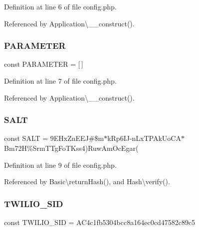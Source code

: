 Definition at line 6 of file config.\+php.



Referenced by Application\textbackslash{}\+\_\+\+\_\+construct().

\hypertarget{config_8php_a75466fbd8ac40be3d3c185c9974118e7}{}\label{config_8php_a75466fbd8ac40be3d3c185c9974118e7} 
\subsubsection{\texorpdfstring{P\+A\+R\+A\+M\+E\+T\+ER}{PARAMETER}}
{\footnotesize\ttfamily const P\+A\+R\+A\+M\+E\+T\+ER = \mbox{[}$\,$\mbox{]}}



Definition at line 7 of file config.\+php.



Referenced by Application\textbackslash{}\+\_\+\+\_\+construct().

\hypertarget{config_8php_a6d448b74f10f8080293b329a47a046b4}{}\label{config_8php_a6d448b74f10f8080293b329a47a046b4} 
\subsubsection{\texorpdfstring{S\+A\+LT}{SALT}}
{\footnotesize\ttfamily const S\+A\+LT = \textquotesingle{}9\+E\+Hx\+Zn\+E\+E\+J\#\$m$\ast$k\+Rp6\+I\+J-\/n\+Lx\+T\+P\+Ak\+Uo\+C\+A$\ast$\+Bm72\+H\%\+Srm\+T\+Tg\+Fo\+T\+Kss4)\+Ruw\+Am\+Oc\+Egar(\textquotesingle{}}



Definition at line 9 of file config.\+php.



Referenced by Basic\textbackslash{}return\+Hash(), and Hash\textbackslash{}verify().

\hypertarget{config_8php_a9b6aafbdebd605cd4fb6f5749b53e59f}{}\label{config_8php_a9b6aafbdebd605cd4fb6f5749b53e59f} 
\subsubsection{\texorpdfstring{T\+W\+I\+L\+I\+O\+\_\+\+S\+ID}{TWILIO\_SID}}
{\footnotesize\ttfamily const T\+W\+I\+L\+I\+O\+\_\+\+S\+ID = \textquotesingle{}A\+C4c1fb5304bcc8a164ec0cd47582c89c5\textquotesingle{}}



